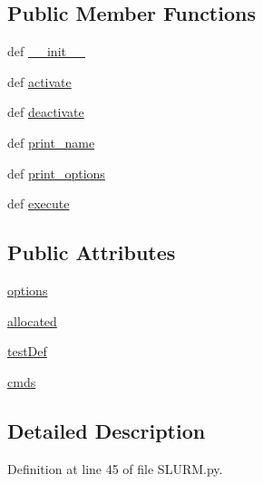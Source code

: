 \subsection*{Public Member Functions}
\begin{DoxyCompactItemize}
\item 
def \hyperlink{class_s_l_u_r_m_1_1_s_l_u_r_m_aa985bacce290322ef03060d671e705a1}{\-\_\-\-\_\-init\-\_\-\-\_\-}
\item 
def \hyperlink{class_s_l_u_r_m_1_1_s_l_u_r_m_a7b3b5d04275a853d623f6fff36b76e7e}{activate}
\item 
def \hyperlink{class_s_l_u_r_m_1_1_s_l_u_r_m_a4622d35bba26ef97a305e9d057e5db6c}{deactivate}
\item 
def \hyperlink{class_s_l_u_r_m_1_1_s_l_u_r_m_a79a9d29418a1a20a9d502c0723c3e8e7}{print\-\_\-name}
\item 
def \hyperlink{class_s_l_u_r_m_1_1_s_l_u_r_m_ad735f2669f29aca338d4dc61b6423284}{print\-\_\-options}
\item 
def \hyperlink{class_s_l_u_r_m_1_1_s_l_u_r_m_ab53b5b6093e23284f0f8494fc2be2263}{execute}
\end{DoxyCompactItemize}
\subsection*{Public Attributes}
\begin{DoxyCompactItemize}
\item 
\hyperlink{class_s_l_u_r_m_1_1_s_l_u_r_m_a652a43986b8bda5c6ddb866ab0513ac8}{options}
\item 
\hyperlink{class_s_l_u_r_m_1_1_s_l_u_r_m_aee4130d6ff2007d08fad045aedd69781}{allocated}
\item 
\hyperlink{class_s_l_u_r_m_1_1_s_l_u_r_m_a9b08ef79e039a8524f1fa6712b45182b}{test\-Def}
\item 
\hyperlink{class_s_l_u_r_m_1_1_s_l_u_r_m_ab755a940fd09c8fa416c177f692d31d6}{cmds}
\end{DoxyCompactItemize}


\subsection{Detailed Description}


Definition at line 45 of file S\-L\-U\-R\-M.\-py.




